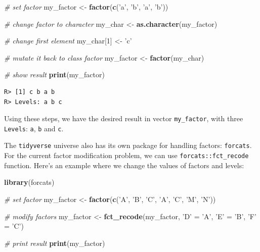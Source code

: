 \documentclass[
  12pt,
]{book}
\newenvironment{Shaded}{\begin{snugshade}}{\end{snugshade}}
\newcommand{\CommentTok}[1]{\textcolor[rgb]{0.37,0.37,0.37}{\textit{#1}}}
\newcommand{\DecValTok}[1]{\textcolor[rgb]{0.06,0.06,0.06}{#1}}
\newcommand{\KeywordTok}[1]{\textcolor[rgb]{0.27,0.27,0.27}{\textbf{#1}}}
\newcommand{\NormalTok}[1]{#1}
\newcommand{\StringTok}[1]{\textcolor[rgb]{0.5,0.5,0.5}{#1}}
\begin{document}
\begin{Shaded}
\begin{Highlighting}[]
\CommentTok{# set factor}
\NormalTok{my_factor <-}\StringTok{ }\KeywordTok{factor}\NormalTok{(}\KeywordTok{c}\NormalTok{(}\StringTok{'a'}\NormalTok{, }\StringTok{'b'}\NormalTok{, }\StringTok{'a'}\NormalTok{, }\StringTok{'b'}\NormalTok{))}

\CommentTok{# change factor to character}
\NormalTok{my_char <-}\StringTok{ }\KeywordTok{as.character}\NormalTok{(my_factor)}

\CommentTok{# change first element}
\NormalTok{my_char[}\DecValTok{1}\NormalTok{] <-}\StringTok{ 'c'}

\CommentTok{# mutate it back to class factor}
\NormalTok{my_factor <-}\StringTok{ }\KeywordTok{factor}\NormalTok{(my_char)}

\CommentTok{# show result}
\KeywordTok{print}\NormalTok{(my_factor)}
\end{Highlighting}
\end{Shaded}

\begin{verbatim}
R> [1] c b a b
R> Levels: a b c
\end{verbatim}

Using these steps, we have the desired result in vector \texttt{my\_factor}, with three \texttt{Levels}: \texttt{a}, \texttt{b} and \texttt{c}.

The \texttt{tidyverse} universe also has its own package for handling factors: \texttt{forcats}. For the current factor modification problem, we can use \texttt{forcats::fct\_recode} function. Here's an example where we change the values of factors and levels: 

\begin{Shaded}
\begin{Highlighting}[]
\KeywordTok{library}\NormalTok{(forcats)}

\CommentTok{# set factor}
\NormalTok{my_factor <-}\StringTok{ }\KeywordTok{factor}\NormalTok{(}\KeywordTok{c}\NormalTok{(}\StringTok{'A'}\NormalTok{, }\StringTok{'B'}\NormalTok{, }\StringTok{'C'}\NormalTok{, }
                      \StringTok{'A'}\NormalTok{, }\StringTok{'C'}\NormalTok{, }\StringTok{'M'}\NormalTok{, }
                      \StringTok{'N'}\NormalTok{))}

\CommentTok{# modify factors}
\NormalTok{my_factor <-}\StringTok{ }\KeywordTok{fct_recode}\NormalTok{(my_factor,}
                        \StringTok{'D'}\NormalTok{ =}\StringTok{ 'A'}\NormalTok{,}
                        \StringTok{'E'}\NormalTok{ =}\StringTok{ 'B'}\NormalTok{,}
                        \StringTok{'F'}\NormalTok{ =}\StringTok{ 'C'}\NormalTok{)}

\CommentTok{# print result}
\KeywordTok{print}\NormalTok{(my_factor)}
\end{Highlighting}
\end{Shaded}
\end{document}
